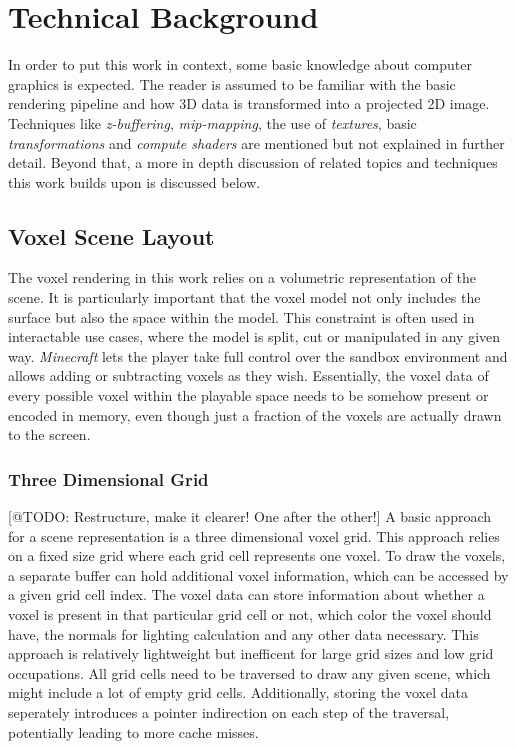\chapter{Technical Background} \label{cpt-technical-background}

In order to put this work in context, some basic knowledge about computer graphics is expected.
The reader is assumed to be familiar with the basic rendering pipeline and how 3D data is 
transformed into a projected 2D image. Techniques like \emph{z-buffering}, \emph{mip-mapping}, 
the use of \emph{textures}, basic \emph{transformations} and \emph{compute shaders} are mentioned 
but not explained in further detail. Beyond that, a more in depth discussion of related topics and 
techniques this work builds upon is discussed below.


\section{Voxel Scene Layout} \label{sec-voxel-scene-layout}

The voxel rendering in this work relies on a volumetric representation of the scene.
It is particularly important that the voxel model not only includes the surface but also 
the space within the model. This constraint is often used in interactable use cases, where 
the model is split, cut or manipulated in any given way. \emph{Minecraft} \cite{Mojang2024}
lets the player take full control over the sandbox environment and allows adding or subtracting 
voxels as they wish. Essentially, the voxel data of every possible voxel within the playable 
space needs to be somehow present or encoded in memory, even though just a fraction of the 
voxels are actually drawn to the screen.


\subsection*{Three Dimensional Grid} \label{subsec-three-dimensional-grid}

[@TODO: Restructure, make it clearer! One after the other!]
A basic approach for a scene representation is a three dimensional voxel grid. This 
approach relies on a fixed size grid where each grid cell represents one voxel.
To draw the voxels, a separate buffer can hold additional voxel information, which 
can be accessed by a given grid cell index. The voxel data can store information about 
whether a voxel is present in that particular grid cell or not, which color the voxel 
should have, the normals for lighting calculation and any other data necessary.
This approach is relatively lightweight but inefficent for large grid sizes and low 
grid occupations. All grid cells need to be traversed to draw any given scene, which 
might include a lot of empty grid cells. Additionally, storing the voxel data seperately
introduces a pointer indirection on each step of the traversal, potentially leading to more 
cache misses.



